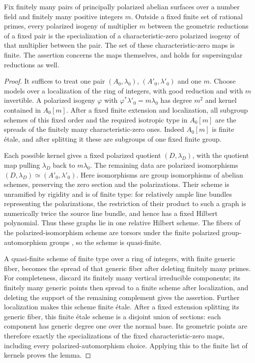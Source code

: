 \begin{lemma}\label{lem:fixed-isogeny-reduction}
Fix finitely many pairs of principally polarized abelian surfaces over a
number field and finitely many positive integers $m$.  Outside a fixed
finite set of rational primes, every polarized isogeny of multiplier $m$
between the geometric reductions of a fixed pair is the specialization of
a characteristic-zero polarized isogeny of that multiplier between the
pair.  The set of these characteristic-zero maps is finite.  The assertion
concerns the maps themselves, and holds for supersingular reductions as
well.
\end{lemma}

\begin{proof}
It suffices to treat one pair $(A_0,\lambda_0)$, $(A'_0,\lambda'_0)$ and
one $m$.  Choose models over a localization of the ring of integers, with
good reduction and with $m$ invertible.  A polarized isogeny
$\varphi$ with $\varphi^*\lambda'_0=m\lambda_0$ has degree $m^2$ and kernel
contained in $A_0[m]$.  After a fixed finite extension and localization,
all subgroup schemes of this fixed order and the required isotropic type
in $A_0[m]$ are the spreads of the finitely many characteristic-zero
ones.  Indeed $A_0[m]$ is finite \'{e}tale, and after splitting it these
are subgroups of one fixed finite group.

Each possible kernel gives a fixed polarized quotient
$(D,\lambda_D)$, with the quotient map pulling $\lambda_D$ back to
$m\lambda_0$.  The remaining data are polarized isomorphisms
$(D,\lambda_D)\simeq(A'_0,\lambda'_0)$.  Here isomorphisms are group isomorphisms of abelian schemes, preserving
the zero section and the polarizations.  Their scheme is unramified by
rigidity and is of finite type: for relatively ample line bundles
representing the polarizations, the restriction of their product to
such a graph is numerically twice the source line bundle, and hence
has a fixed Hilbert polynomial.  Thus these graphs lie in one relative
Hilbert scheme.  The fibers of the polarized-isomorphism scheme are
torsors under the finite polarized
group-automorphism groups \cite[Proposition~17.5]{Milne1986}, so the
scheme is quasi-finite.

A quasi-finite scheme of
finite type over a ring of integers,
with finite generic fiber, becomes the spread of that generic fiber
after deleting finitely many primes.  For completeness, discard its
finitely many vertical irreducible components; its finitely many generic
points then spread to a finite scheme after localization, and deleting
the support of the remaining complement gives the assertion.  Further
localization makes this scheme finite \'{e}tale.  After a fixed extension splitting its generic fiber, this finite
\'{e}tale scheme is a disjoint union of sections: each component has
generic degree one over the normal base.  Its geometric points are
therefore exactly the specializations of the fixed characteristic-zero
maps, including every polarized-automorphism choice.  Applying this to the finite list of kernels
proves the lemma.
\end{proof}

